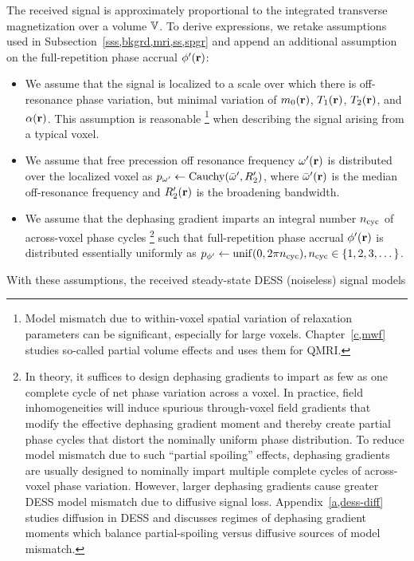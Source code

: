 The received signal is approximately proportional
to the integrated transverse magnetization 
over a volume $\mathbb{V}$.
To derive expressions,
we retake assumptions used
in Subsection~\ref{sss,bkgrd,mri,ss,spgr}
and append an additional assumption
on the full-repetition phase accrual $\php\pr$:
\begin{itemize}
	\item We assume that
		the signal is localized
		to a scale over which
		there is off-resonance phase variation,
		but minimal variation
		of $\mzero\pr$, $\To\pr$, $\Tt\pr$, and $\flip\pr$.
		This assumption is reasonable
		\footnote{Model mismatch due
			to within-voxel spatial variation 
			of relaxation parameters
			can be significant,
			especially for large voxels.
			Chapter~\ref{c,mwf} studies 
			so-called partial volume effects
			and uses them for QMRI.
		} 
		when describing the signal 
		arising from a typical voxel.
	\item We assume that
		free precession off resonance frequency $\omp\pr$
		is distributed over the localized voxel
		as $\dist{\omp} \gets \operatorname{Cauchy}\paren{\ompmed,\Rtp}$,
		where $\ompmed\pr$ is the median off-resonance frequency
		and $\Rtp\pr$ is the broadening bandwidth.
	\item We assume that 
		the dephasing gradient imparts 
		an integral number $n_\mathrm{cyc}$ of across-voxel phase cycles
		\footnote{In theory,
			it suffices to design dephasing gradients
			to impart as few as one complete cycle
			of net phase variation across a voxel.
			In practice,
			field inhomogeneities will induce
			spurious through-voxel field gradients 
			that modify the effective dephasing gradient moment
			and thereby create partial phase cycles
			that distort the nominally uniform phase distribution.
			To reduce model mismatch 
			due to such ``partial spoiling'' effects,
			dephasing gradients are usually designed
			to nominally impart multiple complete cycles
			of across-voxel phase variation.
			However, 
			larger dephasing gradients
			cause greater DESS model mismatch
			due to diffusive signal loss.
			Appendix~\ref{a,dess-diff} 
			studies diffusion in DESS
			and discusses regimes of dephasing gradient moments
			which balance partial-spoiling versus diffusive
			sources of model mismatch.
		}
		such that full-repetition phase accrual $\php\pr$ 
		is distributed essentially uniformly
		as $\dist{\php} \gets \unif{0,2\pi\cyc},
		\cyc\in\set{1,2,3,\dots}$.  
\end{itemize}
With these assumptions, 
the received steady-state DESS (noiseless) signal models
